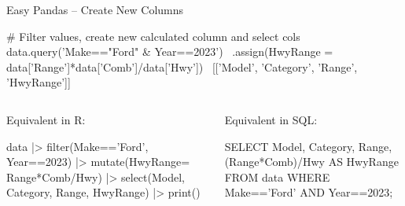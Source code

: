 \documentclass[ignorenonframetext,xcolor=x11names]{beamer}
\begin{document}
\begin{frame}[fragile]{Easy Pandas -- Create New Columns}

\begin{pythoncode}
# Filter values, create new calculated column and select cols
data.query('Make=="Ford" & Year==2023') \
  .assign(HwyRange = data['Range']*data['Comb']/data['Hwy']) \
  [['Model', 'Category', 'Range', 'HwyRange']]
\end{pythoncode}

\vspace{\baselineskip}

\begin{columns}
\begin{column}{.5\textwidth}
Equivalent in R:
\begin{Rcode}
data |> 
  filter(Make=='Ford', 
         Year==2023) |> 
  mutate(HwyRange=
            Range*Comb/Hwy) |>
  select(Model, Category, 
         Range, HwyRange) |>
  print()
\end{Rcode}
\end{column}
\begin{column}{.5\textwidth}
Equivalent in SQL:

\begin{sqlcode}
SELECT Model, Category, Range, 
  (Range*Comb)/Hwy AS HwyRange 
   FROM data 
   WHERE Make=='Ford' AND 
         Year==2023;
\end{sqlcode}
\end{column}
\end{columns}
\end{frame}
\end{document}
